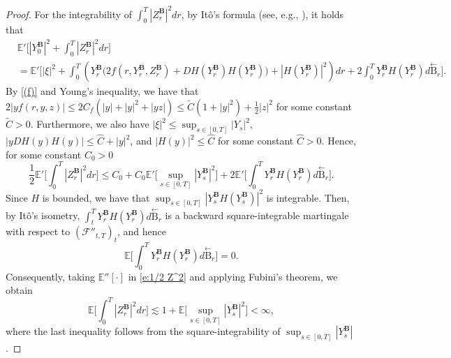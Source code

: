 \documentclass[11pt,reqno]{amsart}
\numberwithin{equation}{section}
\def\E{\mathbb E}
\begin{document}
\begin{proof}
For the integrability of $\int_{0}^{T}|Z^{\mathbf B}_r|^2 dr$, by It\^o's formula (see, e.g., \cite[Lemma~2.1]{ssz19}), it holds that 
\begin{equation*}
\begin{aligned}
&\E'\Big[ |Y^{\mathbf B}_{0}|^2 +  \int_{0}^{T} |Z^{\mathbf B}_r|^2 dr \Big]\\
&= \E'\Big[|\xi|^2 +  \int_{0}^{T} \left(  Y^{\mathbf B}_r \big( 2 f(r,Y^{\mathbf B}_r,Z^{\mathbf B}_r) +  DH(Y^{\mathbf B}_r) H(Y^{\mathbf B}_r) \big) + |H(Y^{\mathbf B}_r)|^2 \right) dr + 2\int_{0}^{T} Y^{\mathbf B}_r H(Y^{\mathbf B}_r) d\overset{\leftarrow}{\mathrm B}_r \Big].
\end{aligned}
\end{equation*}
By \ref{(f)} and Young's inequality, we have that $2 |yf(r,y,z)| \le 2 C_{f} (|y| + |y|^2 + |yz|) \le \tilde C (1 + |y|^2) + \frac{1}{2} |z|^2$ for some constant $\tilde C > 0$. Furthermore, we also have $|\xi|^2 \le \sup_{s\in[0,T]} |Y_s|^2$, $|y DH(y) H(y)| \le \hat C + |y|^2$, and $|H(y)|^2 \le \hat C $ for some constant $\hat C > 0$.  Hence, for some constant $C_0 > 0$
\begin{equation}\label{e:1/2 Z^2}
\frac{1}{2}\E'\Big[\int_{0}^{T} |Z^{\mathbf B}_r|^2 dr \Big] \le C_0 + C_0 \E'\Big[\sup_{s\in[0,T]}|Y^{\mathbf B}_{s}|^2\Big] + 2\E'\Big[\int_{0}^{T}Y^{\mathbf B}_r H(Y^{\mathbf B}_r) d\overset{\leftarrow}{\mathrm B}_r\Big].  
\end{equation}
Since $H$ is bounded, we have that $\sup_{s\in[0,T]}|Y^{\mathbf B}_s H(Y^{\mathbf B}_s)|^2$ is integrable. Then, by It\^o's isometry, $\int_{t}^{T} Y^{\mathbf B}_r H(Y^{\mathbf B}_r) d \overset{\leftarrow}{\mathrm B}_{r}$ is a backward square-integrable martingale with respect to $(\mathcal F''_{t,T})_t$, and hence 
\begin{equation*}
\E\Big[\int_{0}^{T}Y^{\mathbf B}_r H(Y^{\mathbf B}_r) d\overset{\leftarrow}{\mathrm B}_r \Big] = 0. 
\end{equation*}
Consequently, taking $\E''[\bm\cdot]$ in \eqref{e:1/2 Z^2} and applying Fubini's theorem, we obtain
\begin{equation*}
\E\Big[ \int_{0}^{T} |Z^{\mathbf B}_r|^2 dr \Big] \lesssim 1 + \E\Big[ \sup_{s\in[0,T]} |Y^{\mathbf B}_s|^2 \Big] < \infty,
\end{equation*}
where the last inequality follows from the square-integrability of $\sup_{s\in[0,T]}|Y^{\mathbf B}_s|$. 
\end{proof}


\appendix
\end{document}
